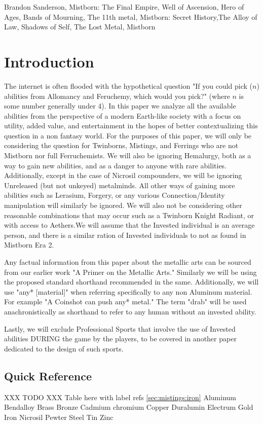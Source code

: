 \documentclass[conference]{IEEEtran}
\newcommand{\n}{\hfill\break}
\begin{document}
\begin{IEEEkeywords}
Brandon Sanderson, Mistborn: The Final Empire, Well of Ascension, Hero of Ages, Bands of Mourning, The 11th metal, Mistborn: Secret History,The Alloy of Law, Shadows of Self, The Lost Metal, Mistborn
\end{IEEEkeywords}
\n
\section{\textbf{Introduction}}
The internet is often flooded with the hypothetical question "If you could pick ($n$) abilities from Allomancy and Feruchemy, which would you pick?" (where $n$ is some number generally under 4).  In this paper we analyze all the available abilities from the perspective of a modern Earth-like society with a focus on utility, added value, and entertainment in the hopes of better contextualizing this question in a non fantasy world.  For the purposes of this paper, we will only be considering the question for Twinborns, Mistings, and Ferrings who are not Mistborn nor full Ferruchemists.  We will also be ignoring Hemalurgy, both as a way to gain new abilities, and as a danger to anyone with rare abilities.  Additionally, except in the case of Nicrosil compounders, we will be ignoring Unreleased (but not unkeyed) metalminds.  All other ways of gaining more abilities such as Lerasium, Forgery, or any various Connection/Identity manipulation will similarly be ignored.  We will also not be considering other reasonable combinations that may occur such as a Twinborn Knight Radiant, or with access to Aethers.\n  We will assume that the Invested individual is an average person, and there is a similar ration of Invested individuals to not as found in Mistborn Era 2.\cite{BoM}\n

Any factual information from this paper about the metallic arts can be sourced from our earlier work "A Primer on the Metallic Arts."\cite{primer} Similarly we will be using the proposed standard shorthand recommended in the same.  Additionally, we will use "any* [material]" when referring specifically to any non Aluminum material.  For example "A Coinshot can push any* metal."  The term "drab" will be used anachronistically as shorthand to refer to any human without an invested ability.\n 

Lastly, we will exclude Professional Sports that involve the use of Invested abilities DURING the game by the players, to be covered in another paper dedicated to the design of such sports.\cite{noseball}
\n
\subsection{\textbf{Quick Reference}}
XXX TODO XXX Table here with label refs \ref{sec:mistings:iron}
Aluminum
Bendalloy
Brass
Bronze
Cadmium
chromium
Copper
Duralumin
Electrum
Gold
Iron
Nicrosil
Pewter
Steel
Tin
Zinc
\end{document}
